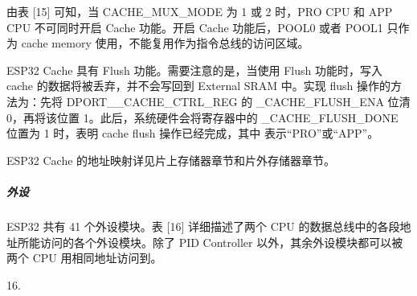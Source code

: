 \documentclass[a4paper,12pt,english]{sphinxmanual}
\begin{document}
\sphinxAtStartPar
由表 {[}1\sphinxhyphen{}5{]} 可知，当 CACHE\_MUX\_MODE 为 1 或 2 时，PRO CPU 和 APP CPU 不可同时开启 Cache 功能。开启 Cache 功能后，POOL0 或者 POOL1 只作为 cache memory 使用，不能复用作为指令总线的访问区域。

\sphinxAtStartPar
ESP32 Cache 具有 Flush 功能。需要注意的是，当使用 Flush 功能时，写入 cache 的数据将被丢弃，并不会写回到 External SRAM 中。实现 flush 操作的方法为：先将 DPORT\_\_CACHE\_CTRL\_REG 的 \_CACHE\_FLUSH\_ENA 位清 0，再将该位置 1。此后，系统硬件会将寄存器中的 \_CACHE\_FLUSH\_DONE 位置为 1 时，表明 cache flush 操作已经完成，其中  表示“PRO”或“APP”。

\sphinxAtStartPar
ESP32 Cache 的地址映射详见片上存储器章节和片外存储器章节。


\subparagraph{外设}
\label{\detokenize{dev-board/esp32:id13}}
\sphinxAtStartPar
ESP32 共有 41 个外设模块。表 {[}1\sphinxhyphen{}6{]} 详细描述了两个 CPU 的数据总线中的各段地址所能访问的各个外设模块。除了 PID Controller 以外，其余外设模块都可以被两个 CPU 用相同地址访问到。

\sphinxAtStartPar
{} 1­\sphinxhyphen{}6. 
\end{document}
